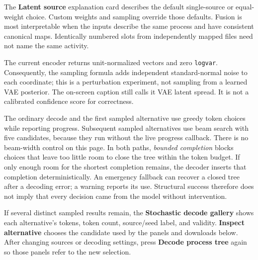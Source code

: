 \documentclass[11pt,a4paper]{article}
\newcommand{\ui}[1]{\textbf{#1}}
\newcommand{\code}[1]{\nolinkurl{#1}}
\begin{document}
The \ui{Latent source} explanation card describes the default single-source
or equal-weight choice. Custom weights and sampling override those defaults.
Fusion is most interpretable when the inputs describe the same process and
have consistent canonical maps. Identically numbered slots from independently
mapped files need not name the same activity.

The current encoder returns unit-normalized vectors and zero \code{logvar}.
Consequently, the sampling formula adds independent standard-normal noise
to each coordinate; this is a perturbation experiment, not sampling from a
learned VAE posterior. The on-screen caption still calls it VAE latent spread.
It is not a calibrated confidence score for correctness.

The ordinary decode and the first sampled alternative use greedy token choices
while reporting progress. Subsequent sampled alternatives use beam search
with five candidates, because they run without the live progress callback.
There is no beam-width control on this page. In both paths, \emph{bounded
completion} blocks choices that leave too little room to close the tree within
the token budget. If only enough room for the shortest completion remains,
the decoder inserts that completion deterministically. An emergency fallback
can recover a closed tree after a decoding error; a warning reports its use.
Structural success therefore does not imply that every decision came from
the model without intervention.

If several distinct sampled results remain, the \ui{Stochastic decode gallery}
shows each alternative's tokens, token count, source/seed label, and validity.
\ui{Inspect alternative} chooses the candidate used by the panels and
downloads below. After changing sources or decoding settings, press
\ui{Decode process tree} again so those panels refer to the new selection.
\end{document}

